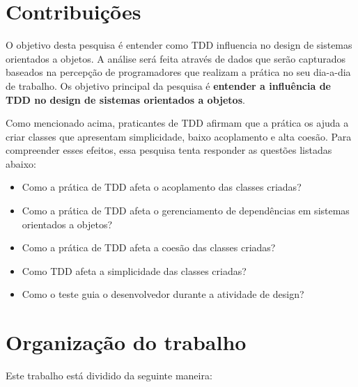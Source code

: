 \section{Contribuições}

O objetivo desta pesquisa é entender como TDD influencia no design de sistemas
orientados a objetos. A análise será feita através de dados que serão
capturados baseados na percepção de programadores que realizam a prática no seu
dia-a-dia de trabalho.
Os objetivo principal da pesquisa é \textbf{entender a influência de TDD no
design de sistemas orientados a objetos}.

Como mencionado acima, praticantes de TDD afirmam que a prática os ajuda a criar
classes que apresentam simplicidade, baixo acoplamento e alta coesão. Para
compreender esses efeitos, essa pesquisa tenta responder as questões listadas
abaixo:

\begin{itemize}

  \item Como a prática de TDD afeta o acoplamento das classes criadas?

  \item Como a prática de TDD afeta o gerenciamento de dependências em sistemas
  orientados a objetos?

  \item Como a prática de TDD afeta a coesão das classes criadas?

  \item Como TDD afeta a simplicidade das classes criadas?

  \item Como o teste guia o desenvolvedor durante a atividade de
  design?

\end{itemize}

\section{Organização do trabalho}

Este trabalho está dividido da seguinte maneira: 

